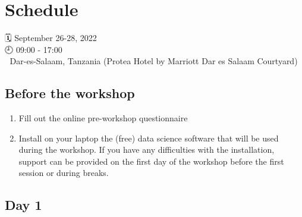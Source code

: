 \documentclass[
  letterpaper,
  DIV=11,
  numbers=noendperiod,
  oneside]{scrreprt}
\providecommand{\tightlist}{%
  \setlength{\itemsep}{0pt}\setlength{\parskip}{0pt}}\usepackage{longtable,booktabs,array}
\begin{document}
\hypertarget{schedule}{%
\section{Schedule}\label{schedule}}

{🗓️} September 26-28, 2022\\
{🕘} 09:00 - 17:00\\
{🌇} Dar-es-Salaam, Tanzania (Protea Hotel by Marriott Dar es Salaam
Courtyard)

\hypertarget{before-the-workshop}{%
\subsection{Before the workshop}\label{before-the-workshop}}

\begin{enumerate}
\def\labelenumi{\arabic{enumi}.}
\tightlist
\item
  Fill out the online pre-workshop questionnaire
\item
  Install on your laptop the (free) data science software that will be
  used during the workshop. If you have any difficulties with the
  installation, support can be provided on the first day of the workshop
  before the first session or during breaks.
\end{enumerate}

\hypertarget{day-1}{%
\subsection{Day 1}\label{day-1}}
\end{document}
